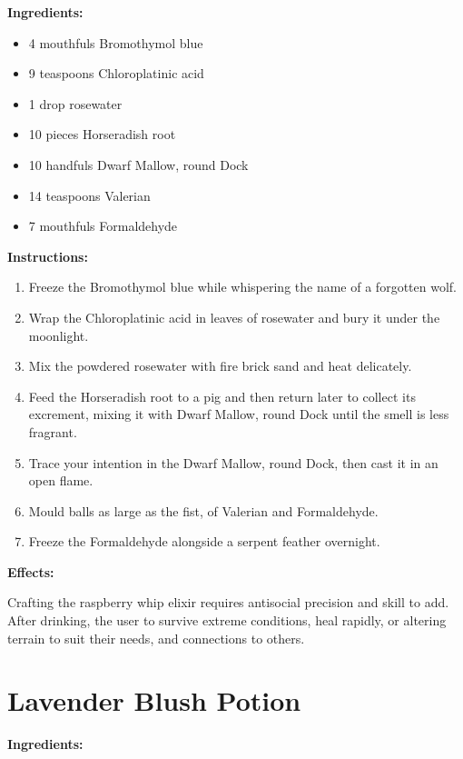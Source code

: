 \documentclass{article}
\begin{document}
\textbf{Ingredients:}

\begin{itemize}
  \item 4 mouthfuls Bromothymol blue
  \item 9 teaspoons Chloroplatinic acid
  \item 1 drop rosewater
  \item 10 pieces Horseradish root
  \item 10 handfuls Dwarf Mallow, round Dock
  \item 14 teaspoons Valerian
  \item 7 mouthfuls Formaldehyde
\end{itemize}

\textbf{Instructions:}

\begin{enumerate}
  \item Freeze the Bromothymol blue while whispering the name of a forgotten wolf.
  \item Wrap the Chloroplatinic acid in leaves of rosewater and bury it under the moonlight.
  \item Mix the powdered rosewater with fire brick sand and heat delicately.
  \item Feed the Horseradish root to a pig and then return later to collect its excrement, mixing it with Dwarf Mallow, round Dock until the smell is less fragrant.
  \item Trace your intention in the Dwarf Mallow, round Dock, then cast it in an open flame.
  \item Mould balls as large as the fist, of Valerian and Formaldehyde.
  \item Freeze the Formaldehyde alongside a serpent feather overnight.
\end{enumerate}

\textbf{Effects:}

Crafting the raspberry whip elixir requires antisocial precision and skill to add. After drinking, the user to survive extreme conditions, heal rapidly, or altering terrain to suit their needs, and connections to others.

\newpage
\section*{Lavender Blush Potion}

\textbf{Ingredients:}
\end{document}
